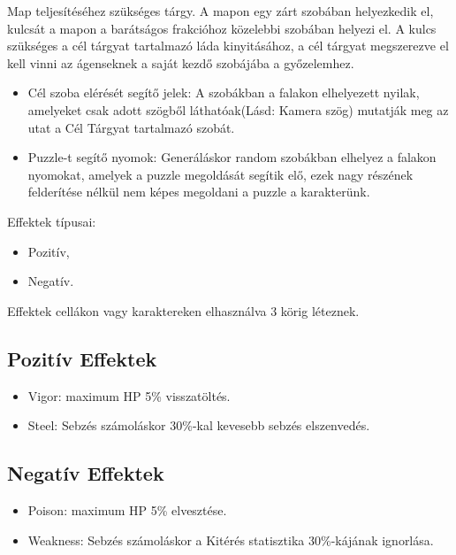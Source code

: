 
Map teljesítéséhez szükséges tárgy.
A mapon egy zárt szobában helyezkedik el, kulcsát a mapon a barátságos frakcióhoz közelebbi szobában helyezi el.
A kulcs szükséges a cél tárgyat tartalmazó láda kinyitásához, a cél tárgyat megszerezve el kell vinni az ágenseknek a saját kezdő szobájába a győzelemhez.

\begin{itemize}
    \item Cél szoba elérését segítő jelek:
    A szobákban a falakon elhelyezett nyilak, amelyeket csak adott szögből láthatóak(Lásd: Kamera szög) mutatják meg az utat a Cél Tárgyat tartalmazó szobát.
    \item Puzzle-t segítő nyomok:
    Generáláskor random szobákban elhelyez a falakon nyomokat, amelyek a puzzle megoldását segítik elő, ezek nagy részének felderítése nélkül nem képes megoldani a puzzle a karakterünk.
\end{itemize}


Effektek típusai:
\begin{itemize}
    \item Pozitív,
    \item Negatív.
\end{itemize}
Effektek cellákon vagy karaktereken elhasználva 3 körig léteznek.

\subsection{Pozitív Effektek}

\begin{itemize}
    \item Vigor: maximum HP 5\% visszatöltés.
    \item Steel: Sebzés számoláskor 30\%-kal kevesebb sebzés elszenvedés.
\end{itemize}

\subsection{Negatív Effektek}

\begin{itemize}
    \item Poison: maximum HP 5\% elvesztése.
    \item Weakness: Sebzés számoláskor a Kitérés statisztika 30\%-kájának ignorlása.
\end{itemize}


